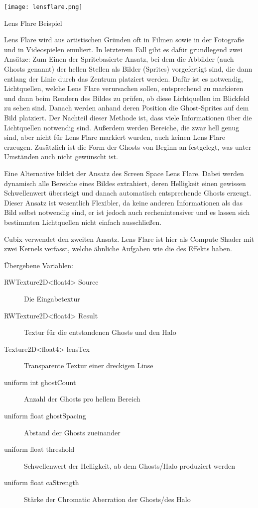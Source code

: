 \texttt{[image: lensflare.png]}
\caption{Lens Flare Beispiel}
\label{img:lensFlareImg}

Lens Flare wird aus artistischen Gründen oft in Filmen sowie in der Fotografie und in Videospielen emuliert. In letzterem Fall gibt es dafür grundlegend zwei Ansätze: Zum Einen der Spritebasierte Ansatz, bei dem die Abbilder (auch Ghosts genannt) der hellen Stellen als Bilder (Sprites) vorgefertigt sind, die dann entlang der Linie durch das Zentrum platziert werden. Dafür ist es notwendig, Lichtquellen, welche Lens Flare verursachen sollen, entsprechend zu markieren und dann beim Rendern des Bildes zu prüfen, ob diese Lichtquellen im Blickfeld zu sehen sind. Danach werden anhand deren Position die Ghost-Sprites auf dem Bild platziert. Der Nachteil dieser Methode ist, dass viele Informationen über die Lichtquellen notwendig sind. Au{\ss}erdem werden Bereiche, die zwar hell genug sind, aber nicht für Lens Flare markiert wurden, auch keinen Lens Flare erzeugen. Zusätzlich ist die Form der Ghosts von Beginn an festgelegt, was unter Umständen auch nicht gewünscht ist.

Eine Alternative bildet der Ansatz des Screen Space Lens Flare. Dabei werden dynamisch alle Bereiche eines Bildes extrahiert, deren Helligkeit einen gewissen Schwellenwert übersteigt und danach automatisch entsprechende Ghosts erzeugt. Dieser Ansatz ist wesentlich Flexibler, da keine anderen Informationen als das Bild selbst notwendig sind, er ist jedoch auch rechenintensiver und es lassen sich bestimmten Lichtquellen nicht einfach ausschlie{\ss}en.

Cubix verwendet den zweiten Ansatz. Lens Flare ist hier als Compute Shader mit zwei Kernels verfasst, welche ähnliche Aufgaben wie die des  Effekts haben.

Übergebene Variablen:
\begin{description}
\item[RWTexture2D<float4> Source] Die Eingabetextur
\item[RWTexture2D<float4> Result] Textur für die entstandenen Ghosts und den Halo
\item[Texture2D<float4> lensTex] Transparente Textur einer dreckigen Linse
\item[uniform int ghostCount] Anzahl der Ghosts pro hellem Bereich
\item[uniform float ghostSpacing] Abstand der Ghosts zueinander
\item[uniform float threshold] Schwellenwert der Helligkeit, ab dem Ghosts/Halo produziert werden
\item[uniform float caStrength] Stärke der Chromatic Aberration der Ghosts/des Halo
\end{description}

